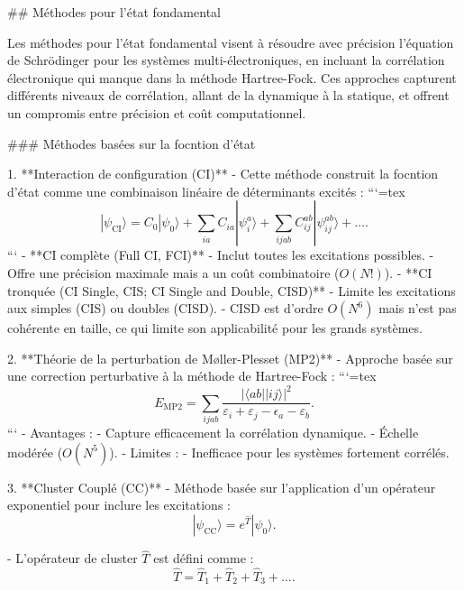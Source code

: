 \documentclass[12pt,a4paper]{report}
\begin{document}
\begin{markdown}
## Méthodes pour l'état fondamental

Les méthodes pour l'état fondamental visent à résoudre avec précision l'équation de Schrödinger pour les systèmes multi-électroniques, en incluant la corrélation électronique qui manque dans la méthode Hartree-Fock. Ces approches capturent différents niveaux de corrélation, allant de la dynamique à la statique, et offrent un compromis entre précision et coût computationnel.

### Méthodes basées sur la focntion d'état

1. **Interaction de configuration (CI)**
   - Cette méthode construit la focntion d'état comme une combinaison linéaire de déterminants excités :
```{=tex}
\begin{equation}
|\psi_{\text{CI}}\rangle = C_0 |\psi_0\rangle + \sum_{ia} C_{ia} |\psi_i^a\rangle + \sum_{ijab} C_{ij}^{ab} |\psi_{ij}^{ab}\rangle + \dots .
\end{equation}
```
   - **CI complète (Full CI, FCI)**
     - Inclut toutes les excitations possibles.
     - Offre une précision maximale mais a un coût combinatoire ($O(N!)$).
   - **CI tronquée (CI Single, CIS; CI Single and Double, CISD)** 
     - Limite les excitations aux simples (CIS) ou doubles (CISD).
     - CISD est d'ordre $O(N^6)$ mais n'est pas cohérente en taille, ce qui limite son applicabilité pour les grands systèmes.

2. **Théorie de la perturbation de Møller-Plesset (MP2)**
   - Approche basée sur une correction perturbative à la méthode de Hartree-Fock :
```{=tex}
\begin{equation}
E_{\text{MP2}} = \sum_{ijab} \frac{|\langle ab || ij \rangle|^2}{\varepsilon_i + \varepsilon_j - \epsilon_a - \varepsilon_b} .
\end{equation}
```
   - Avantages :
     - Capture efficacement la corrélation dynamique.
     - Échelle modérée ($O(N^5)$).
   - Limites :
     - Inefficace pour les systèmes fortement corrélés.

3. **Cluster Couplé (CC)**
   - Méthode basée sur l'application d'un opérateur exponentiel pour inclure les excitations :
\begin{equation}
|\psi_{\text{CC}}\rangle = e^{\hat{T}} |\psi_0\rangle .
\end{equation}

   - L'opérateur de cluster $\hat{T}$ est défini comme :
\begin{equation}
\hat{T} = \hat{T}_1 + \hat{T}_2 + \hat{T}_3 + \dots .
\end{equation}


\end{markdown}
\end{document}
